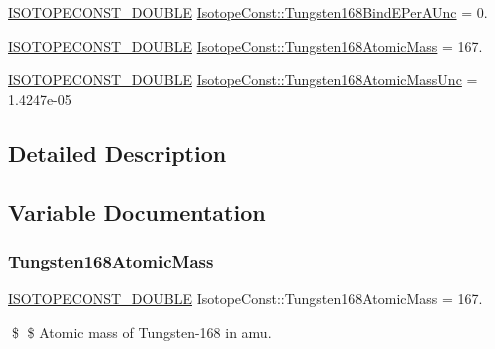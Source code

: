 \begin{DoxyCompactItemize}
\mbox{\hyperlink{group___isotope_const-_macros_ga8f45a7272ce02c0b4c65c44636ed719a}{I\+S\+O\+T\+O\+P\+E\+C\+O\+N\+S\+T\+\_\+\+D\+O\+U\+B\+LE}} \mbox{\hyperlink{group___isotope_const-_tungsten-_w168_ga6c6283524697ba5dcceb4f645404b8ec}{Isotope\+Const\+::\+Tungsten168\+Bind\+E\+Per\+A\+Unc}} = 0.
\item 
\mbox{\hyperlink{group___isotope_const-_macros_ga8f45a7272ce02c0b4c65c44636ed719a}{I\+S\+O\+T\+O\+P\+E\+C\+O\+N\+S\+T\+\_\+\+D\+O\+U\+B\+LE}} \mbox{\hyperlink{group___isotope_const-_tungsten-_w168_gaab4d846d57849e27ea6584bebd21566e}{Isotope\+Const\+::\+Tungsten168\+Atomic\+Mass}} = 167.
\item 
\mbox{\hyperlink{group___isotope_const-_macros_ga8f45a7272ce02c0b4c65c44636ed719a}{I\+S\+O\+T\+O\+P\+E\+C\+O\+N\+S\+T\+\_\+\+D\+O\+U\+B\+LE}} \mbox{\hyperlink{group___isotope_const-_tungsten-_w168_ga90e8024b3cbe068a5403b50df2640499}{Isotope\+Const\+::\+Tungsten168\+Atomic\+Mass\+Unc}} = 1.\+4247e-\/05
\end{DoxyCompactItemize}


\subsection{Detailed Description}


\subsection{Variable Documentation}
\mbox{\label{group___isotope_const-_tungsten-_w168_gaab4d846d57849e27ea6584bebd21566e}} 
\subsubsection{\texorpdfstring{Tungsten168\+Atomic\+Mass}{Tungsten168AtomicMass}}
{\footnotesize\ttfamily \mbox{\hyperlink{group___isotope_const-_macros_ga8f45a7272ce02c0b4c65c44636ed719a}{I\+S\+O\+T\+O\+P\+E\+C\+O\+N\+S\+T\+\_\+\+D\+O\+U\+B\+LE}} Isotope\+Const\+::\+Tungsten168\+Atomic\+Mass = 167.}

\$ \$ Atomic mass of Tungsten-\/168 in amu. \mbox{\label{group___isotope_const-_tungsten-_w168_ga90e8024b3cbe068a5403b50df2640499}} 
